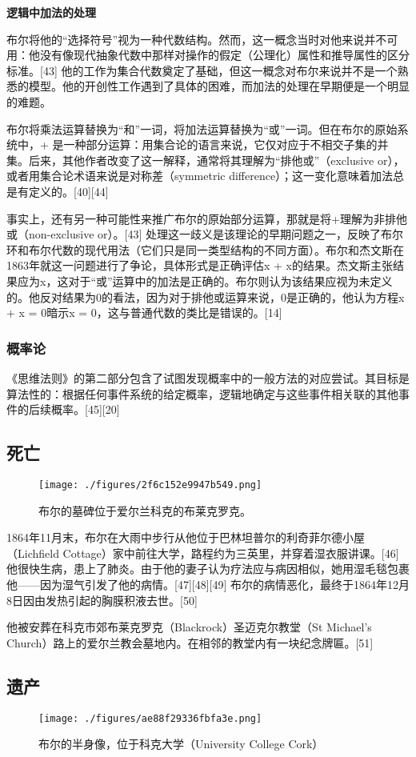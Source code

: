 \textbf{逻辑中加法的处理}  

布尔将他的“选择符号”视为一种代数结构。然而，这一概念当时对他来说并不可用：他没有像现代抽象代数中那样对操作的假定（公理化）属性和推导属性的区分标准。[43] 他的工作为集合代数奠定了基础，但这一概念对布尔来说并不是一个熟悉的模型。他的开创性工作遇到了具体的困难，而加法的处理在早期便是一个明显的难题。

布尔将乘法运算替换为“和”一词，将加法运算替换为“或”一词。但在布尔的原始系统中，+ 是一种部分运算：用集合论的语言来说，它仅对应于不相交子集的并集。后来，其他作者改变了这一解释，通常将其理解为“排他或”（exclusive or），或者用集合论术语来说是对称差（symmetric difference）；这一变化意味着加法总是有定义的。[40][44]

事实上，还有另一种可能性来推广布尔的原始部分运算，那就是将+理解为非排他或（non-exclusive or）。[43] 处理这一歧义是该理论的早期问题之一，反映了布尔环和布尔代数的现代用法（它们只是同一类型结构的不同方面）。布尔和杰文斯在1863年就这一问题进行了争论，具体形式是正确评估x + x的结果。杰文斯主张结果应为x，这对于“或”运算中的加法是正确的。布尔则认为该结果应视为未定义的。他反对结果为0的看法，因为对于排他或运算来说，0是正确的，他认为方程x + x = 0暗示x = 0，这与普通代数的类比是错误的。[14]
\subsubsection{概率论}  
《思维法则》的第二部分包含了试图发现概率中的一般方法的对应尝试。其目标是算法性的：根据任何事件系统的给定概率，逻辑地确定与这些事件相关联的其他事件的后续概率。[45][20]
\subsection{死亡}
\begin{figure}[ht]
\centering
\texttt{[image: ./figures/2f6c152e9947b549.png]}
\caption{布尔的墓碑位于爱尔兰科克的布莱克罗克。} \label{fig_George_9}
\end{figure}
1864年11月末，布尔在大雨中步行从他位于巴林坦普尔的利奇菲尔德小屋（Lichfield Cottage）家中前往大学，路程约为三英里，并穿着湿衣服讲课。[46] 他很快生病，患上了肺炎。由于他的妻子认为疗法应与病因相似，她用湿毛毯包裹他——因为湿气引发了他的病情。[47][48][49] 布尔的病情恶化，最终于1864年12月8日因由发热引起的胸膜积液去世。[50]

他被安葬在科克市郊布莱克罗克（Blackrock）圣迈克尔教堂（St Michael's Church）路上的爱尔兰教会墓地内。在相邻的教堂内有一块纪念牌匾。[51]
\subsection{遗产}
\begin{figure}[ht]
\centering
\texttt{[image: ./figures/ae88f29336fbfa3e.png]}
\caption{布尔的半身像，位于科克大学（University College Cork）} \label{fig_George_8}
\end{figure}